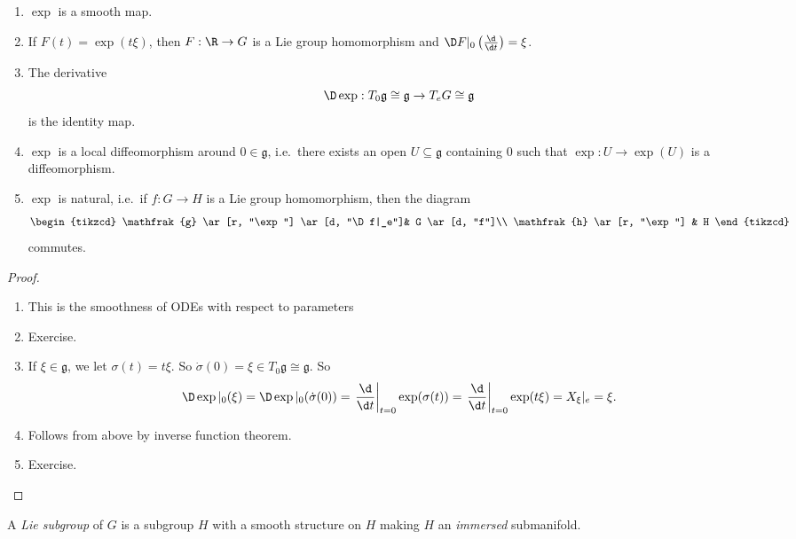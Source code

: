 \documentclass[a4paper]{article}
\begin{document}
\begin{prop}\leavevmode
  \begin{enumerate}
    \item $\exp$ is a smooth map.
    \item If $F(t) = \exp(t\xi)$, then $F: \R \to G$ is a Lie group homomorphism and $\D F|_0 \left(\frac{\d}{\d t}\right) = \xi$.
    \item The derivative
      \[
        \D \exp: T_0 \mathfrak{g} \cong \mathfrak{g} \to T_e G \cong \mathfrak{g}
      \]
      is the identity map.
    \item $\exp$ is a local diffeomorphism around $0 \in \mathfrak{g}$, i.e.\ there exists an open $U \subseteq \mathfrak{g}$ containing $0$ such that $\exp: U \to \exp(U)$ is a diffeomorphism.
    \item $\exp$ is natural, i.e.\ if $f: G \to H$ is a Lie group homomorphism, then the diagram
      \[
        \begin{tikzcd}
          \mathfrak{g} \ar[r, "\exp"] \ar[d, "\D f|_e"]& G \ar[d, "f"]\\
          \mathfrak{h} \ar[r, "\exp"] & H
        \end{tikzcd}
      \]
      commutes.
  \end{enumerate}
\end{prop}

\begin{proof}\leavevmode
  \begin{enumerate}
    \item This is the smoothness of ODEs with respect to parameters
    \item Exercise.
    \item If $\xi \in \mathfrak{g}$, we let $\sigma(t) = t \xi$. So $\dot{\sigma}(0) = \xi \in T_0 \mathfrak{g} \cong \mathfrak{g}$. So
      \[
        \D \exp|_0 (\xi) = \D \exp|_0(\dot{\sigma}(0)) = \left.\frac{\d}{\d t}\right|_{t = 0} \exp(\sigma(t)) = \left.\frac{\d}{\d t}\right|_{t = 0} \exp(t \xi) = X_\xi|_e = \xi.
      \]
    \item Follows from above by inverse function theorem.
    \item Exercise. \qedhere
  \end{enumerate}
\end{proof}

\begin{defi}
  A \emph{Lie subgroup} of $G$ is a subgroup $H$ with a smooth structure on $H$ making $H$ an \emph{immersed} submanifold.
\end{defi}
\end{document}
